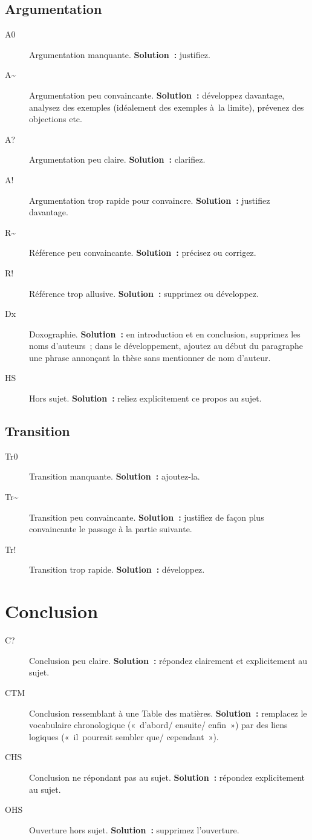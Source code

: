 \documentclass[a4paper,11pt]{article}
\begin{document}
\subsection{Argumentation}
\label{sec:orge69f846}
\begin{description}
\item[{A0}] Argumentation manquante. \textbf{Solution :} justifiez.
\item[{A\textasciitilde{}}] Argumentation peu convaincante. \textbf{Solution :} développez
davantage, analysez des exemples (idéalement des exemples à la
limite), prévenez des objections etc.
\item[{A\string?}] Argumentation peu claire. \textbf{Solution :} clarifiez.
\item[{A\string!}] Argumentation trop rapide pour convaincre. \textbf{Solution :}
justifiez davantage.
\item[{R\textasciitilde{}}] Référence peu convaincante. \textbf{Solution :} précisez ou corrigez.
\item[{R\string!}] Référence trop allusive. \textbf{Solution :} supprimez ou
développez.
\item[{Dx}] Doxographie. \textbf{Solution :} en introduction et en conclusion,
supprimez les noms d'auteurs ; dans le développement, ajoutez au début
du paragraphe une phrase annonçant la thèse sans mentionner de nom
d'auteur.
\item[{HS}] Hors sujet. \textbf{Solution :} reliez explicitement ce propos au
sujet.
\end{description}

\subsection{Transition}
\label{sec:orgff51e73}
\begin{description}
\item[{Tr0}] Transition manquante. \textbf{Solution :} ajoutez-la.
\item[{Tr\textasciitilde{}}] Transition peu convaincante. \textbf{Solution :} justifiez de façon
plus convaincante le passage à la partie suivante.
\item[{Tr\string!}] Transition trop rapide. \textbf{Solution :} développez.
\end{description}

\section{Conclusion}
\label{sec:orga95c7c7}
\begin{description}
\item[{C\string?}] Conclusion peu claire. \textbf{Solution :} répondez clairement
et explicitement au sujet.
\item[{CTM}] Conclusion ressemblant à une Table des matières. \textbf{Solution :}
remplacez le vocabulaire chronologique (« d'abord/ ensuite/
enfin ») par des liens logiques (« il pourrait sembler que/
cependant »).
\item[{CHS}] Conclusion ne répondant pas au sujet. \textbf{Solution :} répondez
explicitement au sujet.
\item[{OHS}] Ouverture hors sujet. \textbf{Solution :} supprimez l'ouverture.
\end{description}
\end{document}

